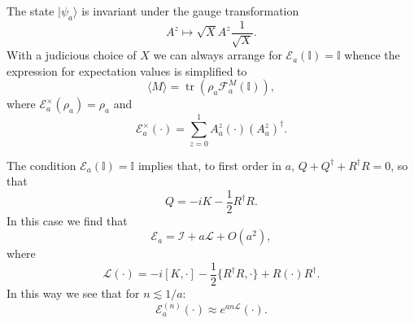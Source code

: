 \documentclass[prl,twocolumn,lengthcheck,superscriptaddress]{revtex4-1}
\newcommand{\tr}{\operatorname{tr}}
\theoremstyle{definition}
\theoremstyle{remark}
\begin{document}
The state $|\psi_a\rangle$ is invariant under the gauge transformation 
\begin{equation}
A^z \mapsto \sqrt{X} A^{z} \frac{1}{\sqrt{X}}.
\end{equation}
With a judicious choice of $X$ we can always arrange for $\mathcal{E}_a(\mathbb{I}) = \mathbb{I}$ whence the expression for expectation values is simplified to
\begin{equation}
	\langle M \rangle = \tr(\rho_a \mathcal{F}_a^{M}(\mathbb{I})),
\end{equation}
where $\mathcal{E}_a^{\times} (\rho_a) = \rho_a$ and 
\begin{equation}
	\mathcal{E}_a^\times(\cdot) = \sum_{z=0}^1 A^z_a (\cdot) (A^z_a)^\dag.
\end{equation}

The condition $\mathcal{E}_a(\mathbb{I}) = \mathbb{I}$ implies that, to first order in $a$, $Q+Q^\dag + R^\dag R = 0$, so that 
\begin{equation}
	Q = -iK -\frac12 R^\dag R.
\end{equation}
In this case we find that 
\begin{equation}
	\mathcal{E}_a = \mathcal{I} + a \mathcal{L} + O(a^2),
\end{equation}
where
\begin{equation}
	\mathcal{L}(\cdot) = -i[K, \cdot] - \frac12\{R^\dag R, \cdot \} + R (\cdot) R^\dag.
\end{equation}
In this way we see that for $n\lesssim 1/a$:
\begin{equation}
	\mathcal{E}_a^{(n)}(\cdot) \approx e^{an \mathcal{L}} (\cdot).
\end{equation}
\end{document}

